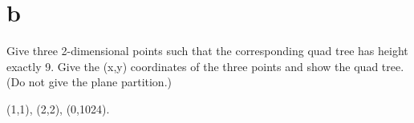 \documentclass[12pt]{article}
\begin{document}
\begin{enumerate}
\begin{center}
\begin{sideways}
\end{sideways}
\end{center}
\part{b} Give three 2-dimensional points such that the corresponding
quad tree has height exactly 9.  Give the (x,y) coordinates of the
three points and show the quad tree.  (Do not give the plane
partition.)

(1,1), (2,2), (0,1024).
\end{enumerate}

\end{document}
